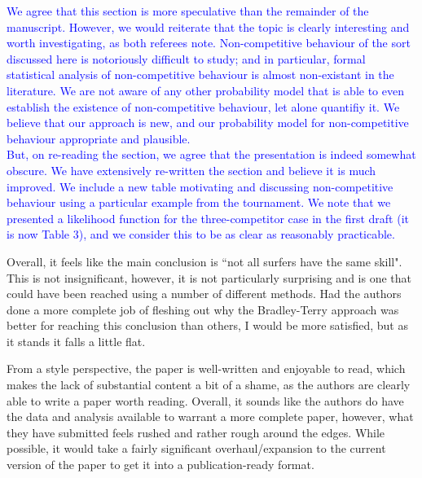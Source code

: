 \documentclass[12pt]{article}
\begin{document}
\textcolor{blue}{We agree that this section is more speculative than
  the remainder of the manuscript.  However, we would reiterate that
  the topic is clearly interesting and worth investigating, as both
  referees note.  Non-competitive behaviour of the sort discussed here
  is notoriously difficult to study; and in particular, formal
  statistical analysis of non-competitive behaviour is almost
  non-existant in the literature.  We are not aware of any other
  probability model that is able to even establish the existence of
  non-competitive behaviour, let alone quantifiy it.  We believe that
  our approach is new, and our probability model for non-competitive
  behaviour appropriate and plausible.\\ But, on re-reading the
  section, we agree that the presentation is indeed somewhat obscure.
  We have extensively re-written the section and believe it is much
  improved.  We include a new table motivating and discussing
  non-competitive behaviour using a particular example from the
  tournament.  We note that we presented a likelihood function for the
  three-competitor case in the first draft (it is now Table 3), and we
  consider this to be as clear as reasonably practicable.}

Overall, it feels like the main conclusion is ``not all surfers have
the same skill". This is not insignificant, however, it is not
particularly surprising and is one that could have been reached using
a number of different methods. Had the authors done a more complete
job of fleshing out why the Bradley-Terry approach was better for
reaching this conclusion than others, I would be more satisfied, but
as it stands it falls a little flat.


From a style perspective, the paper is well-written and enjoyable to
read, which makes the lack of substantial content a bit of a shame, as
the authors are clearly able to write a paper worth reading. Overall,
it sounds like the authors do have the data and analysis available to
warrant a more complete paper, however, what they have submitted feels
rushed and rather rough around the edges. While possible, it would
take a fairly significant overhaul/expansion to the current version of
the paper to get it into a publication-ready format.
\end{document}
